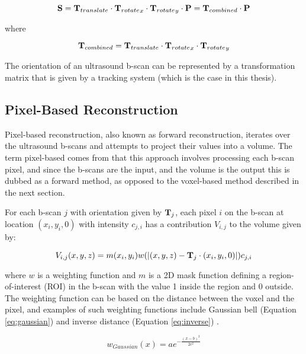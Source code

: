 	\begin{equation}
		\textbf{S} = \textbf{T}_{translate} \cdot {\textbf{T}_{rotate}}_x \cdot {\textbf{T}_{rotate}}_y \cdot \textbf{P} = \textbf{T}_{combined} \cdot \textbf{P}
		\label{eq:transformation_combination_1}
	\end{equation}
	
	where
	
	\begin{equation}
		\textbf{T}_{combined} = \textbf{T}_{translate} \cdot {\textbf{T}_{rotate}}_x \cdot {\textbf{T}_{rotate}}_y
		\label{eq:transformation_combination_2}
	\end{equation}
	
	The orientation of an ultrasound b-scan can be represented by a transformation matrix that is given by a tracking system (which is the case in this thesis).

\subsection{Pixel-Based Reconstruction}

	Pixel-based reconstruction, also known as forward reconstruction, iterates over the ultrasound b-scans and attempts to project their values into a volume. The term pixel-based comes from that this approach involves processing each b-scan pixel, and since the b-scans are the input, and the volume is the output this is dubbed as a forward method, as opposed to the voxel-based method described in the next section.
	
	For each b-scan $j$ with orientation given by $\textbf{T}_j$, each pixel $i$ on the b-scan at location $(x_i, y_i, 0)$ with intensity $c_{j,i}$ has a contribution $V_{i,j}$ to the volume given by:
	
	\begin{equation}
		V_{i,j}(x, y, z) = m(x_i, y_i) w(|(x, y, z) - \textbf{T}_j \cdot (x_i, y_i, 0)|) c_{j,i}
	\end{equation}
	
	where $w$ is a weighting function and $m$ is a 2D mask function defining a region-of-interest (ROI) in the b-scan with the value 1 inside the region and 0 outside. The weighting function can be based on the distance between the voxel and the pixel, and examples of such weighting functions include Gaussian bell (Equation \ref{eq:gaussian}) and inverse distance (Equation \ref{eq:inverse}) \cite{gonzalez2008}.
	
	\begin{equation}
		w_{Gaussian}(x) = ae^{-{\frac{(x-b)^2}{2c^2}}}
		\label{eq:gaussian}
	\end{equation}
	
